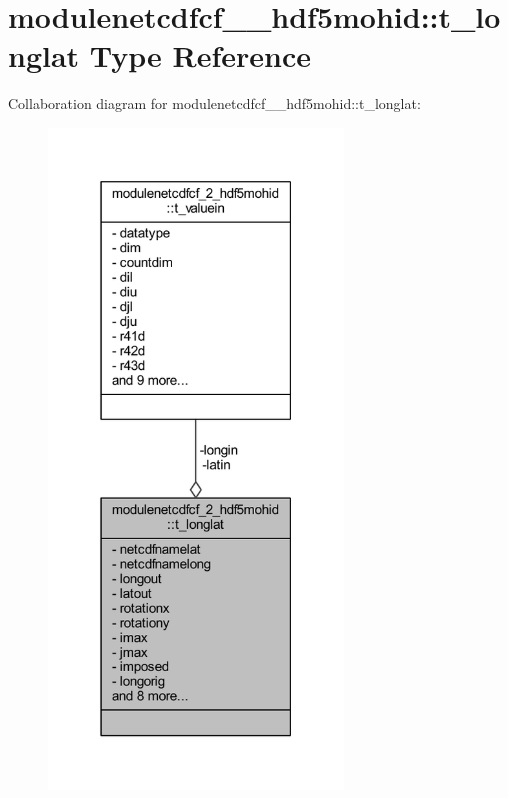 \hypertarget{structmodulenetcdfcf__2__hdf5mohid_1_1t__longlat}{}\section{modulenetcdfcf\+\_\+\_\+hdf5mohid\+:\+:t\+\_\+longlat Type Reference}
\label{structmodulenetcdfcf__2__hdf5mohid_1_1t__longlat}


Collaboration diagram for modulenetcdfcf\+\_\+\_\+hdf5mohid\+:\+:t\+\_\+longlat\+:\nopagebreak
\begin{figure}[H]
\begin{center}
\leavevmode
\includegraphics[width=222pt]{structmodulenetcdfcf__2__hdf5mohid_1_1t__longlat__coll__graph}
\end{center}
\end{figure}
